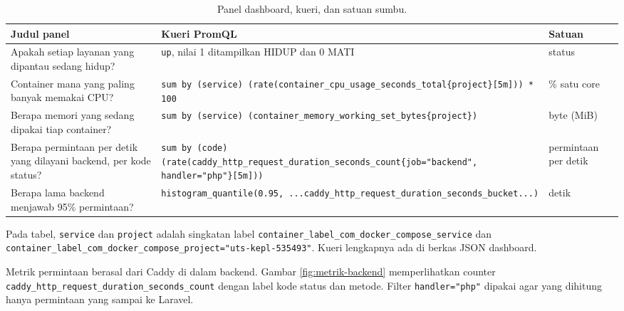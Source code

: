 \documentclass[a4paper,oneside,12pt]{report}
\begin{document}
\begin{table}[!htbp]
\centering
\small
\caption{Panel dashboard, kueri, dan satuan sumbu.}
\label{tab:panel}
\begin{tabular}{>{\raggedright\arraybackslash}p{4.2cm}>{\raggedright\arraybackslash}p{6.6cm}>{\raggedright\arraybackslash}p{2.3cm}}
\toprule
Judul panel & Kueri PromQL & Satuan \\
\midrule
Apakah setiap layanan yang dipantau sedang hidup? & \texttt{up},\allowbreak{} nilai 1 ditampilkan HIDUP dan 0 MATI & status \\
Container mana yang paling banyak memakai CPU? & \texttt{sum by (\allowbreak{}service) (\allowbreak{}rate(\allowbreak{}container\_\allowbreak{}cpu\_\allowbreak{}usage\_\allowbreak{}seconds\_\allowbreak{}total\{project\}[5m])) * 100} & \% satu core \\
Berapa memori yang sedang dipakai tiap container? & \texttt{sum by (\allowbreak{}service) (\allowbreak{}container\_\allowbreak{}memory\_\allowbreak{}working\_\allowbreak{}set\_\allowbreak{}bytes\{project\})} & byte (\allowbreak{}MiB) \\
Berapa permintaan per detik yang dilayani backend,\allowbreak{} per kode status? & \texttt{sum by (\allowbreak{}code) (\allowbreak{}rate(\allowbreak{}caddy\_\allowbreak{}http\_\allowbreak{}request\_\allowbreak{}duration\_\allowbreak{}seconds\_\allowbreak{}count\{job="backend",\allowbreak{} handler="php"\}[5m]))} & permintaan per detik \\
Berapa lama backend menjawab 95\% permintaan? & \texttt{histogram\_\allowbreak{}quantile(\allowbreak{}0.95,\allowbreak{} ...caddy\_\allowbreak{}http\_\allowbreak{}request\_\allowbreak{}duration\_\allowbreak{}seconds\_\allowbreak{}bucket...)} & detik \\
\bottomrule
\end{tabular}
\end{table}

Pada tabel, \texttt{service} dan \texttt{project} adalah singkatan label \texttt{container\_label\_com\_docker\_compose\_service} dan \texttt{container\_label\_com\_docker\_compose\_project="uts-kepl-535493"}. Kueri lengkapnya ada di berkas JSON dashboard.

Metrik permintaan berasal dari Caddy di dalam backend. Gambar \ref{fig:metrik-backend} memperlihatkan counter \texttt{caddy\_http\_request\_duration\_seconds\_count} dengan label kode status dan metode. Filter \texttt{handler="php"} dipakai agar yang dihitung hanya permintaan yang sampai ke Laravel.
\end{document}

